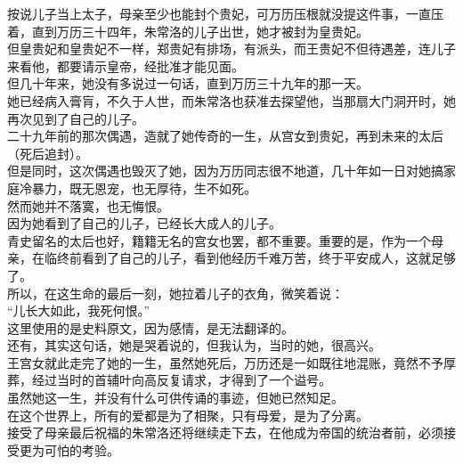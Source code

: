 \begin{multicols}{\theparacolNo}
按说儿子当上太子，母亲至少也能封个贵妃，可万历压根就没提这件事，一直压着，直到万历三十四年，朱常洛的儿子出世，她才被封为皇贵妃。\\

但皇贵妃和皇贵妃不一样，郑贵妃有排场，有派头，而王贵妃不但待遇差，连儿子来看他，都要请示皇帝，经批准才能见面。\\

但几十年来，她没有多说过一句话，直到万历三十九年的那一天。\\

她已经病入膏肓，不久于人世，而朱常洛也获准去探望他，当那扇大门洞开时，她再次见到了自己的儿子。\\

二十九年前的那次偶遇，造就了她传奇的一生，从宫女到贵妃，再到未来的太后（死后追封）。\\

但是同时，这次偶遇也毁灭了她，因为万历同志很不地道，几十年如一日对她搞家庭冷暴力，既无恩宠，也无厚待，生不如死。\\

然而她并不落寞，也无悔恨。\\

因为她看到了自己的儿子，已经长大成人的儿子。\\

青史留名的太后也好，籍籍无名的宫女也罢，都不重要。重要的是，作为一个母亲，在临终前看到了自己的儿子，看到他经历千难万苦，终于平安成人，这就足够了。\\

所以，在这生命的最后一刻，她拉着儿子的衣角，微笑着说：\\

“儿长大如此，我死何恨。”\\

这里使用的是史料原文，因为感情，是无法翻译的。\\

还有，其实这句话，她是哭着说的，但我认为，当时的她，很高兴。\\

王宫女就此走完了她的一生，虽然她死后，万历还是一如既往地混账，竟然不予厚葬，经过当时的首辅叶向高反复请求，才得到了一个谥号。\\

虽然她这一生，并没有什么可供传诵的事迹，但她已然知足。\\

在这个世界上，所有的爱都是为了相聚，只有母爱，是为了分离。\\

接受了母亲最后祝福的朱常洛还将继续走下去，在他成为帝国的统治者前，必须接受更为可怕的考验。\\


\end{multicols}
